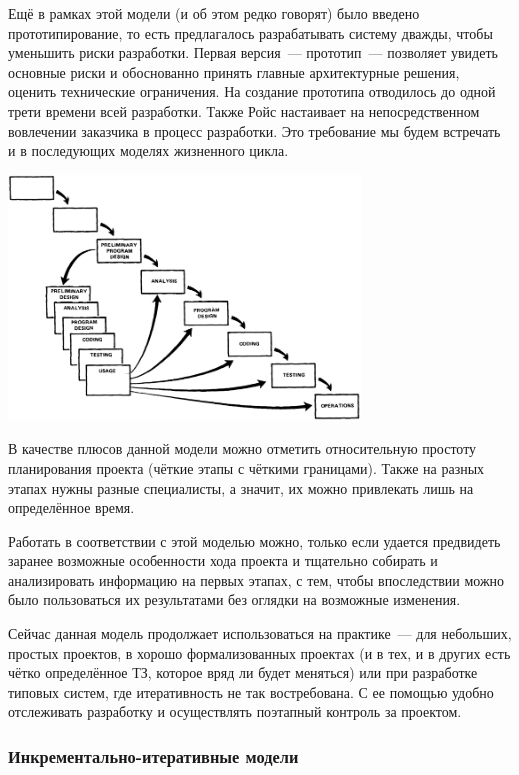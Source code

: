 \documentclass{../../text-style}
\begin{document}
Ещё в рамках этой модели (и об этом редко говорят) было введено прототипирование, то есть предлагалось разрабатывать систему дважды, чтобы уменьшить риски разработки.
Первая версия~--- прототип~--- позволяет увидеть основные риски и обоснованно принять главные архитектурные решения, оценить технические ограничения.
На создание прототипа отводилось до одной трети времени всей разработки.
Также Ройс настаивает на непосредственном вовлечении заказчика в процесс разработки.
Это требование мы будем встречать и в последующих моделях жизненного цикла.

\begin{center}
    \includegraphics[width=0.7\textwidth]{waterfallPrototyping.png}
\end{center}

В качестве плюсов данной модели можно отметить относительную простоту планирования проекта (чёткие этапы с чёткими границами).
Также на разных этапах нужны разные специалисты, а значит, их можно привлекать лишь на определённое время.

Работать в соответствии с этой моделью можно, только если удается предвидеть заранее возможные особенности хода проекта и тщательно собирать и анализировать информацию на первых этапах, с тем, чтобы впоследствии можно было пользоваться их результатами без оглядки на возможные изменения.

Сейчас данная модель продолжает использоваться на практике~--- для небольших, простых проектов, в хорошо формализованных проектах (и в тех, и в других есть чётко определённое ТЗ, которое вряд ли будет меняться) или при разработке типовых систем, где итеративность не так востребована.
С ее помощью удобно отслеживать разработку и осуществлять поэтапный контроль за проектом.

\subsubsection{Инкрементально-итеративные модели}
\end{document}
